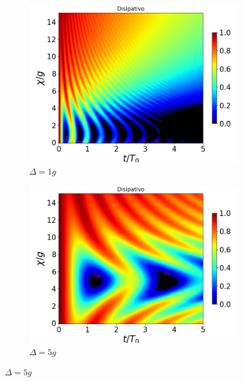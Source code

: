 \begin{figure}[h]
    \centering
    \begin{subfigure}{0.49\textwidth}
        \includegraphics[width=\textwidth]{figuras/ch4/concu/chi/eg0+ge0 d=1.0g k=0.0g J=0.0g gamma=0.25g concu chi dis.png}
        \caption{$\Delta=1g$}
        \label{fig4:concu x d1}
    \end{subfigure}
    \hfill
    \begin{subfigure}{0.49\textwidth}
        \includegraphics[width=\textwidth]{figuras/ch4/concu/chi/eg0+ge0 d=5.0g k=0.0g J=0.0g gamma=0.25g concu chi dis.png}
        \caption{$\Delta=5g$}
        \label{fig4:concu x d2}
    \end{subfigure}
    \vfill

\end{figure}
